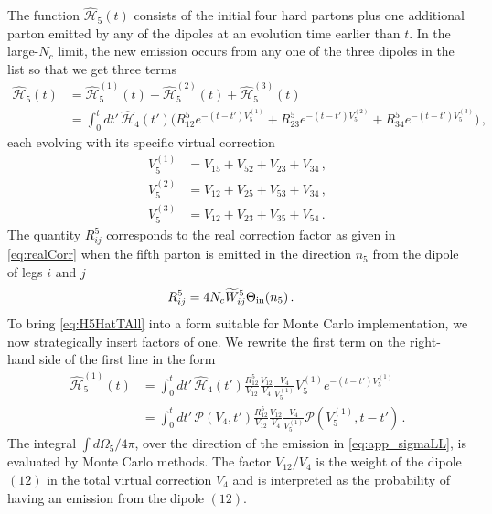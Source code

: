 \documentclass[11pt,a4paper]{article}
\begin{document}
The function $\hat{\mathcal{H}}_5(t)$ consists of the initial four hard partons plus one additional parton emitted by any of the dipoles at an evolution time earlier than $t$. In the large-$N_c$ limit, the new emission occurs from any one of the three dipoles in the list so that we get three terms
\begin{align}\label{eq:H5HatTAll}
\mathcal{\hat{H}}_5(t)&= \mathcal{\hat{H}}^{(1)}_5(t) + \mathcal{\hat{H}}^{(2)}_5(t) + \mathcal{\hat{H}}^{(3)}_5(t)\nonumber \\
& =  \int_{0}^{t} dt' \,\mathcal{\hat{H}}_{4}(t')  \Big(
R_{12}^5 e^{-(t-t')   V_5^{(1)}}
+R_{23}^5 e^{-(t-t') V_5^{(2)}} +R_{34}^5 e^{-(t-t') V_5^{(3)}}\Big) \, ,
\end{align}
each evolving with its specific virtual correction
\begin{align}
V_5^{(1)} &= V_{15}+V_{52}+V_{23}+V_{34}\, , \nonumber \\
V_5^{(2)} &= V_{12}+V_{25}+V_{53}+V_{34}\,  , \nonumber \\
V_5^{(3)} &= V_{12}+V_{23}+V_{35}+V_{54} \,. 
\end{align}
The quantity $R_{ij}^5$ corresponds to the real correction factor as given in {\eqref{eq:realCorr}} when the fifth parton  is emitted in the direction $n_5$ from the dipole of legs $i$ and $j$
\begin{align}
R_{ij}^5 & = 4 N_c  \widetilde{W}_{ij}^5 \Theta_{\rm in}(n_{5}) \,.\label{eq:app_realEmission}
\end{align}
To bring \eqref{eq:H5HatTAll} into a form suitable for Monte Carlo implementation, we now strategically insert factors of one. We rewrite the first term on the right-hand side of the first line in the form
\begin{align}
\mathcal{\hat{H}}^{(1)}_5(t) &=\int_{0}^{t} dt' \,\mathcal{\hat{H}}_{4}(t') \frac{R_{12}^5}{V_{12}}\frac{V_{12}}{V_4}\frac{V_{4}}{V_5^{(1)} } V_5^{(1)}  e^{-(t-t')  V_5^{(1)} } \nonumber \\
&=\int_{0}^{t} dt' \,\mathcal{P}( V_4,t')  \frac{R_{12}^5}{V_{12}}\frac{V_{12}}{V_4}\frac{V_4}{ V_5^{(1)}} \mathcal{P}( V_5^{(1)} ,t-t') \, . \label{eq:H5HatT}
\end{align} 
The integral $\int d\Omega_5/4\pi$, over the direction of the emission in \eqref{eq:app_sigmaLL}, is evaluated by Monte Carlo methods.  The factor $V_{12}/V_4$ is the weight of the dipole $(12)$ in the total virtual correction $V_4$ and is interpreted as the probability of having an emission from the dipole $(12)$. 
\end{document}
